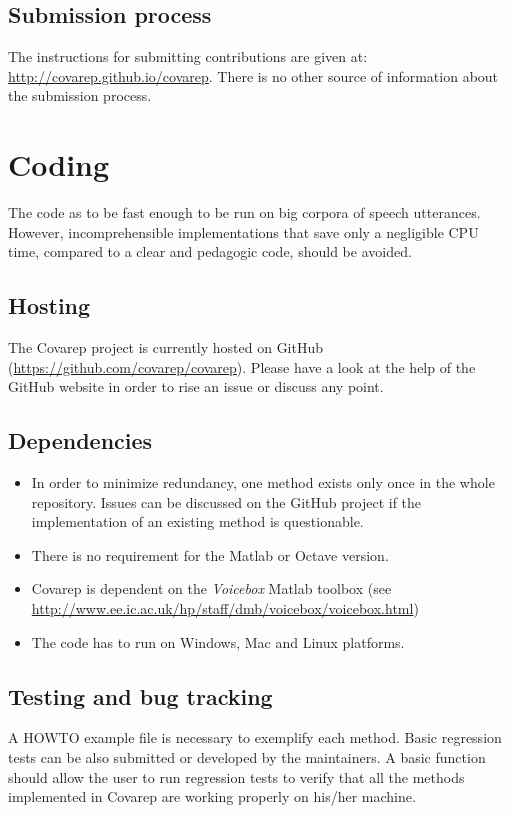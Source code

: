 \documentclass{article}
\begin{document}
    \subsection{Submission process}
    The instructions for submitting contributions are given at:
    \url{http://covarep.github.io/covarep}.
	There is no other source of information about the submission process.

\newpage

\section{Coding}

    The code as to be fast enough to be run on big corpora of speech utterances.
    However, incomprehensible implementations that save only a negligible CPU time, compared to a clear and pedagogic code, should be avoided.

    \subsection{Hosting}
    The Covarep project is currently hosted on GitHub (\url{https://github.com/covarep/covarep}).
    Please have a look at the help of the GitHub website in order to rise an issue or discuss any point.

    \subsection{Dependencies}
    \begin{itemize}
    \item In order to minimize redundancy, one method exists only once in the whole repository. Issues can be discussed on the GitHub project if the implementation of an existing method is questionable.
    \item There is no requirement for the Matlab or Octave version.
    \item Covarep is dependent on the \textit{Voicebox} Matlab toolbox (see \url{http://www.ee.ic.ac.uk/hp/staff/dmb/voicebox/voicebox.html})
    \item The code has to run on Windows, Mac and Linux platforms.
    \end{itemize}

    \subsection{Testing and bug tracking}
    A HOWTO example file is necessary to exemplify each method.
    Basic regression tests can be also submitted or developed by the maintainers.
    A basic function should allow the user to run regression tests to verify that all the methods implemented in Covarep are working properly on his/her machine.
\end{document}
